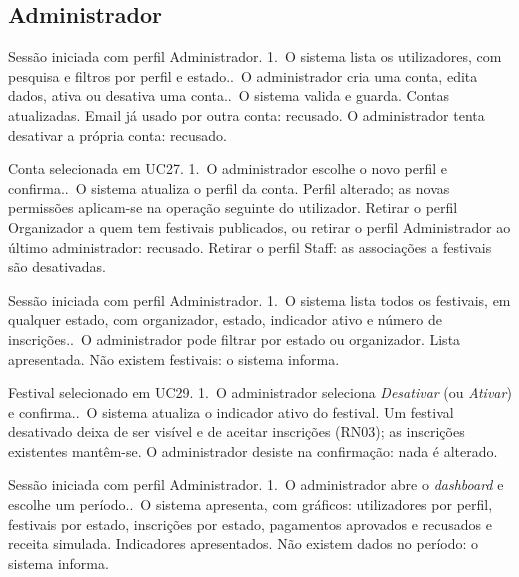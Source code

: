 \subsection{Administrador}

{Sessão iniciada com perfil Administrador.}
{1.~O sistema lista os utilizadores, com pesquisa e filtros por perfil e
 estado..~O administrador cria uma conta, edita dados, ativa ou desativa uma
 conta..~O sistema valida e guarda.}
{Contas atualizadas.}
{Email já usado por outra conta: recusado.
 O administrador tenta desativar a própria conta: recusado.}

{Conta selecionada em UC27.}
{1.~O administrador escolhe o novo perfil e confirma..~O sistema atualiza o perfil da conta.}
{Perfil alterado; as novas permissões aplicam-se na operação seguinte do
 utilizador.}
{Retirar o perfil Organizador a quem tem festivais publicados, ou retirar o
 perfil Administrador ao último administrador: recusado.
 Retirar o perfil Staff: as associações a festivais são desativadas.}

{Sessão iniciada com perfil Administrador.}
{1.~O sistema lista todos os festivais, em qualquer estado, com organizador,
 estado, indicador ativo e número de inscrições..~O administrador pode filtrar por estado ou organizador.}
{Lista apresentada.}
{Não existem festivais: o sistema informa.}

{Festival selecionado em UC29.}
{1.~O administrador seleciona \emph{Desativar} (ou \emph{Ativar}) e
 confirma..~O sistema atualiza o indicador ativo do festival.}
{Um festival desativado deixa de ser visível e de aceitar inscrições (RN03);
 as inscrições existentes mantêm-se.}
{O administrador desiste na confirmação: nada é alterado.}

{Sessão iniciada com perfil Administrador.}
{1.~O administrador abre o \emph{dashboard} e escolhe um período..~O sistema apresenta, com gráficos: utilizadores por perfil, festivais por
 estado, inscrições por estado, pagamentos aprovados e recusados e receita
 simulada.}
{Indicadores apresentados.}
{Não existem dados no período: o sistema informa.}

